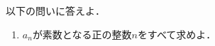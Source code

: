 \documentclass[../../main.tex]{subfiles}
\begin{document}
以下の問いに答えよ．
\begin{enumerate}
  $n$に対して，二項係数に関する次の等式を示せ．
    \[ n \, _{2n}C_n=(n+1) \, _{2n}C_{n-1} \]
    また，これを用いて$_{2n}C_n$は$n+1$の倍数であることを示せ．
  $n$に対して，
    \[ a_n=\frac{_{2n}C_n}{n+1} \]
    とおく．このとき，$n\geqq4$ならば$a_n>n+2$であることを示せ．
  \item$a_n$が素数となる正の整数$n$をすべて求めよ．
\end{enumerate}
\end{document}
